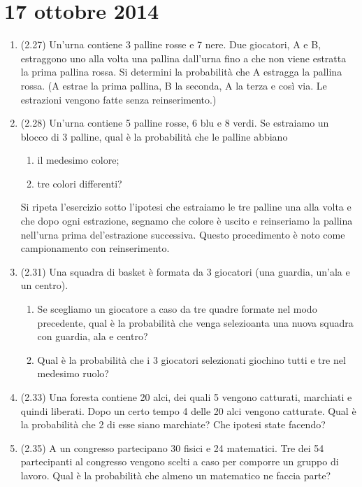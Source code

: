 \section{17 ottobre 2014}

\begin{enumerate}
    \item (2.27) Un'urna contiene 3 palline rosse e 7 nere. Due giocatori, A e B, estraggono uno alla volta una pallina dall'urna fino a che non viene estratta la prima pallina rossa. Si determini la probabilit\`a che A estragga la pallina rossa. (A estrae la prima pallina, B la seconda, A la terza e cos\`i via. Le estrazioni vengono fatte senza reinserimento.)
    \item (2.28) Un'urna contiene 5 palline rosse, 6 blu e 8 verdi. Se estraiamo un blocco di 3 palline, qual \`e la probabilit\`a che le palline abbiano
    \begin{enumerate}
        \item il medesimo colore;
        \item tre colori differenti?
    \end{enumerate}
    Si ripeta l'esercizio sotto l'ipotesi che estraiamo le tre palline una alla volta e che dopo ogni estrazione, segnamo che colore \`e uscito e reinseriamo la pallina nell'urna prima del'estrazione successiva. Questo procedimento \`e noto come campionamento con reinserimento.
    \item (2.31) Una squadra di basket \`e formata da 3 giocatori (una guardia, un'ala e un centro).
    \begin{enumerate}
        \item Se scegliamo un giocatore a caso da tre quadre formate nel modo precedente, qual \`e la probabilit\`a che venga selezioanta una nuova squadra con guardia, ala e centro?
        \item Qual \`e la probabilit\`a che i 3 giocatori selezionati giochino tutti e tre nel medesimo ruolo?
    \end{enumerate}
    \item (2.33) Una foresta contiene 20 alci, dei quali 5 vengono catturati, marchiati e quindi liberati. Dopo un certo tempo 4 delle 20 alci vengono catturate. Qual \`e la probabilit\`a che 2 di esse siano marchiate? Che ipotesi state facendo?
    \item (2.35) A un congresso partecipano 30 fisici e 24 matematici. Tre dei 54 partecipanti al congresso vengono scelti a caso per comporre un gruppo di lavoro. Qual \`e la probabilit\`a che almeno un matematico ne faccia parte?

\end{enumerate}

